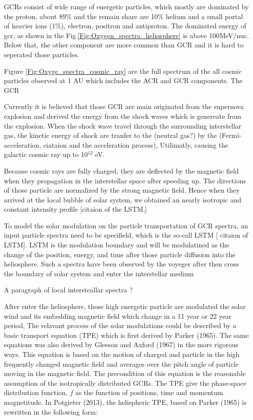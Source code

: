 GCRs consist of wide range of energetic particles,  which mostly are dominated by the proton, about 89\%  and the remain share are 10\% helium and a small portal of heavier ions (1\%), electron, positron and antiproton. The dominated energy of gcr, as shown in the Fig.\ref{Fig:Oxygen_spectra_heliosphere} is above 100MeV/nuc. Below that, the other component are more common than GCR and it is hard to seperated those particles.

Figure \ref{Fig:Oxyge_spectra_cosmic_ray} are the full spectrum of the all cosmic particles observed at 1 AU which includes the ACR and GCR components.  The GCR


Currently it is believed that those GCR are main originated from the supernova explosion and derived the energy from the shock waves which is genereate from the explosion. When the shock wave travel through the surrounding interstellar gas, the kinetic energy of shock are tranfer to the  (neutral gas?) by the (Fermi-acceleration, ciataion and the acceleration process), Utilimatly, causing the galactic cosmic ray up to 10$^12$ eV.

Because cosmic rays are fully charged, they are deflected by the magnetic field when they propagation in the interstellar space after speeding up. The directions of those particle are normalized by the strong magnetic field. Hence when they arrived at the local bubble of solar system, we obtained an nearly isotropic and constant intensity profile [citaion of the LSTM,]


To model the solar modulation on the particle transportation of GCR spectra, an input particle spectra need to be specifield, which is the so-call LSTM [ citaion of LSTM]. LSTM is the modulation boundary and will be modulatined as the change of the position, energy, and time after those particle diffusion into the heliosphere. Such a spectra have been observed by the voyeger after then cross the boundary of solar system and enter the interstellar medium


A paragraph of local intersteallar spectra ?


After enter the heliosphere, those high energetic particle are modulated the solar wind and its embedding magnetic field  which change in a 11 year or 22 year period,
The relavant process of the solar modulations could be described by a basic transport equation (TPE) which is first derived by Parker (1965). The same equations was also derived by Gleeson and Axford (1967) in the more rigorous ways. This equation is based on the motion of charged and particle in the high frequently changed magnetic field and averages over the pitch angle of particle moving in the magnetic field. The precondition of this equation is the reasonable assumption of the isotropically distributed GCRs. The TPE give the phase-space distribution function, $f$ as the function of positions, time  and momentum magnetitude. In Potgieter (2013), the helispheric TPE, based on Parker (1965) is rewritten in the following form:

